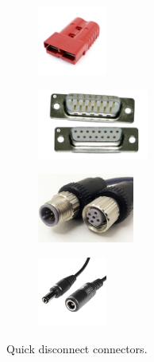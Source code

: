 \begin{figure}[H]
\begin{subfigure}[b]{.24\linewidth}
\includegraphics[height=0.9in]{imgs/connector_anderson.png}
\end{subfigure}\begin{subfigure}[b]{.24\linewidth}
\includegraphics[height=0.9in]{imgs/connector_dsub.jpeg}
\end{subfigure}\begin{subfigure}[b]{.24\linewidth}
\includegraphics[height=0.9in]{imgs/connector_screw.png}
\end{subfigure}\begin{subfigure}[b]{.24\linewidth}
\includegraphics[height=0.9in]{imgs/connector_barreljack.jpeg}
\end{subfigure}
\caption{Quick disconnect connectors.}
\end{figure}

